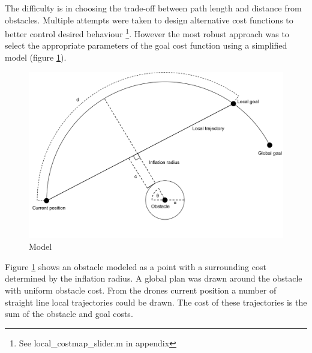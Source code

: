 \documentclass[capstone_report.tex]{subfiles}
\begin{document}
The difficulty is in choosing the trade-off between path length and distance from obstacles.  Multiple attempts were taken to design alternative cost functions to better control desired behaviour \footnote{See local\_costmap\_slider.m in appendix}.  However the most robust approach was to select the appropriate parameters of the goal cost function using a simplified model (figure \ref{fig:goal_cost_model}). 

\begin{figure}[H]
    \centering
    \includegraphics[width=1\textwidth]{imgs/obstacle_vs_goal.png}
    \caption{Model}\label{fig:goal_cost_model}
\end{figure}

Figure \ref{fig:goal_cost_model} shows an obstacle modeled as a point with a surrounding cost determined by the inflation radius.  A global plan was drawn around the obstacle with uniform obstacle cost.  From the drones current position a number of straight line local trajectories could be drawn.  The cost of these trajectories is the sum of the obstacle and goal costs.
\end{document}
